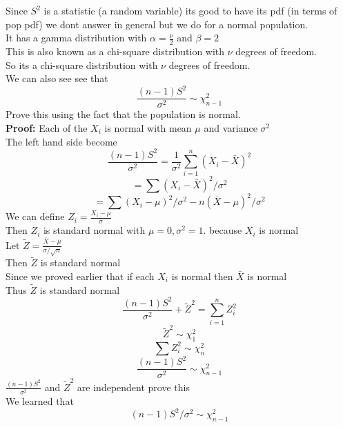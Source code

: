 \documentclass{article}
\begin{document}
Since $S^2$ is a statistic (a random variable)
its good to have its pdf (in terms of pop pdf) we dont answer in general but we do for a normal population.\\
It has a gamma distribution with $\alpha = \frac{\nu}{2}$ and $\beta = 2$\\ 
This is also known as a chi-square distribution with $\nu$ degrees of freedom.\\
So its a chi-square distribution with $\nu$ degrees of freedom.\\
We can also see see that 
$$ \frac{(n-1) S^2}{\sigma^2} \sim \chi^2_{n-1}$$
Prove this using the fact that the population is normal.\\
\textbf{Proof:}
Each of the $X_i$ is normal with mean $\mu$ and variance $\sigma^2$\\
The left hand side become 
$$ \frac{(n-1) S^2}{\sigma^2} = \frac{1}{\sigma^2} \sum_{i=1}^{n} (X_i - \bar{X})^2$$
$$ = \sum (X_i - \bar{X})^2/\sigma^2$$
$$ = \sum (X_i - \mu)^2/\sigma^2 - n(\bar{X} - \mu)^2/\sigma^2$$
We can define $Z_i = \frac{X_i - \mu}{\sigma}$\\
Then $Z_i$ is standard normal with $\mu = 0, \sigma^2 =1$. because $X_i$ is normal\\
Let $\tilde{Z} = \frac{\bar{X} - \mu}{\sigma/\sqrt{n}}$\\
Then $\tilde{Z}$ is standard normal\\
Since we proved earlier that if each $X_i$ is normal then $\bar{X}$ is normal\\
Thus $\tilde{Z}$ is standard normal\\
$$ \frac{(n-1)S^2}{\sigma^2} + \tilde{Z}^2 = \sum_{i=1}^{n} Z_i^2$$
$$ \tilde{Z}^2 \sim \chi^2_{1}$$
$$ \sum Z_i^2 \sim \chi^2_{n}$$
$$ \frac{(n-1)S^2}{\sigma^2} \sim \chi^2_{n-1}$$
$ \frac{(n-1)S^2}{\sigma^2}$ and $\tilde{Z}^2$ are independent prove this\\
We learned that 
$$ (n-1)S^2/\sigma^2 \sim \chi^2_{n-1}$$
\end{document}
